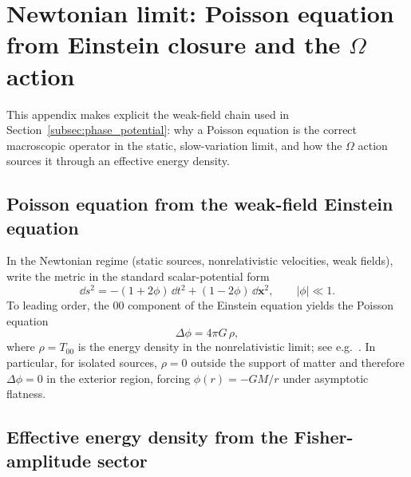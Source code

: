 \section{Newtonian limit: Poisson equation from Einstein closure and the \texorpdfstring{$\Omega$}{Omega} action}
\label{app:newtonian_limit}

This appendix makes explicit the weak-field chain used in Section~\ref{subsec:phase_potential}: why a Poisson equation is the correct macroscopic operator in the static, slow-variation limit, and how the $\Omega$ action sources it through an effective energy density.

\subsection{Poisson equation from the weak-field Einstein equation}
\label{app:poisson_from_gr}

In the Newtonian regime (static sources, nonrelativistic velocities, weak fields), write the metric in the standard scalar-potential form
\begin{equation}
  \dd s^{2} = -(1+2\phi)\,\dd t^{2} + (1-2\phi)\,\dd\mathbf{x}^{2},
  \qquad |\phi|\ll 1 .
\end{equation}
To leading order, the $00$ component of the Einstein equation yields the Poisson equation
\begin{equation}
  \Delta \phi = 4\pi G\,\rho,
\end{equation}
where $\rho=T_{00}$ is the energy density in the nonrelativistic limit; see e.g.\ \cite{Wald1984,Carroll2004,MisnerThorneWheeler1973}.
In particular, for isolated sources, $\rho=0$ outside the support of matter and therefore $\Delta\phi=0$ in the exterior region, forcing $\phi(r)=-GM/r$ under asymptotic flatness.

\subsection{Effective energy density from the Fisher-amplitude sector}
\label{app:rho_info}

